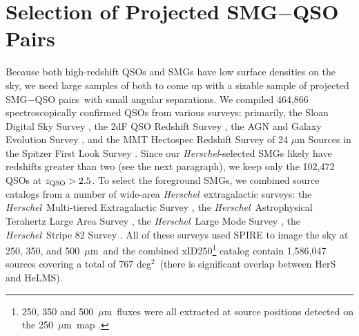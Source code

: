 \documentclass[iop,revtex4,twocolumn,apj,numberedappendix,appendixfloats]{emulateapj}
\newcommand{\hers}{{\it Herschel}}
\newcommand{\um}{$\mu$m}
\newcommand{\sqdeg}{deg$^2$}
\newcommand{\sqps}{SMG$-$QSO pairs}
\begin{document}

\section{Selection of Projected SMG$-$QSO Pairs} \label{sec:sample}

Because both high-redshift QSOs and SMGs have low surface densities on the sky, we need large samples of both to come up with a sizable sample of projected \sqps\ with small angular separations. We compiled 464,866 spectroscopically confirmed QSOs from various surveys: primarily, the Sloan Digital Sky Survey \citep[SDSS;][]{Alam15}, the 2dF QSO Redshift Survey \citep[2QZ;][]{Croom04}, the AGN and Galaxy Evolution Survey \citep[AGES;][]{Kochanek12}, and the MMT Hectospec Redshift Survey of 24 {$\mu$}m Sources in the Spitzer First Look Survey \citep{Papovich06}. Since our \hers-selected SMGs likely have redshifts greater than two (see the next paragraph), we keep only the 102,472 QSOs at $z_{\rm QSO} > 2.5$. To select the foreground SMGs, we combined source catalogs from a number of wide-area \hers\ extragalactic surveys: the \hers\ Multi-tiered Extragalactic Survey \citep[HerMES, 95 \sqdeg;][]{Oliver12,Wang14a}, the \hers\ Astrophysical Terahertz Large Area Survey \citep[H-ATLAS, 600 \sqdeg;][]{Eales10,Valiante16}, the \hers\ Large Mode Survey \citep[HeLMS, 301 \sqdeg;][]{Oliver12,Clarke16,Asboth16,Nayyeri16}, the \hers\ Stripe 82 Survey \citep[HerS, 79 \sqdeg;][]{Viero14}. All of these surveys used SPIRE \citep[Spectral and Photometric Imaging Receiver;][]{Griffin10} to image the sky at 250, 350, and 500~\um\ and the combined xID250\footnote{250, 350 and 500~\um\ fluxes were all extracted at source positions detected on the 250~\um\ map \citep[e.g.,][]{Roseboom10,Rigby11}.} catalog contain 1,586,047 sources covering a total of 767 \sqdeg\ (there is significant overlap between HerS and HeLMS).

\end{document}

